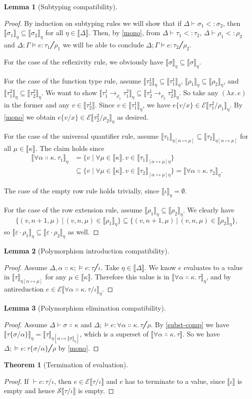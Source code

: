 \documentclass[a4paper, 12pt]{report}
\newcommand{\subst}[2]{\{#1/#2\}}
\newcommand{\E}{\mathcal{E}}
\renewcommand{\S}{\mathcal{S}}
\newcommand{\+}{\enspace}
\newtheorem{lemma}{Lemma}
\newtheorem{theorem}{Theorem}
\begin{document}
\begin{lemma}[Subtyping compatibility]
\end{lemma}
\begin{proof}
By induction on subtyping rules we will show that
if $Δ ⊢ σ_1 <: σ_2$, then $⟦σ_1⟧_η ⊆ ⟦σ_2⟧_η$ for all $η ∈ ⟦Δ⟧$.
Then, by \cref{mono}, from $Δ ⊢ τ_1 <: τ_2$, $Δ ⊢ ρ_1 <: ρ_2$ and $Δ; Γ ⊨ e : τ_1╱ρ_1$
we will be able to conclude
$Δ; Γ ⊨ e : τ_2╱ρ_2$.

For the case of the reflexivity rule,
we obviously have $⟦σ⟧_η ⊆ ⟦σ⟧_η$.

For the case of the function type rule,
assume $⟦τ_2^1⟧_η ⊆ ⟦τ_1^1⟧_η$, $⟦ρ_1⟧_η ⊆ ⟦ρ_2⟧_η$, and $⟦τ_1^2⟧_η ⊆ ⟦τ_2^2⟧_η$.
We want to show $⟦τ_1^1 →_{ρ_1} τ_1^2⟧_η ⊆ ⟦τ_2^1 →_{ρ_2} τ_2^2⟧_η$.
So take any $(λx.\,e)$ in the former and any $v ∈ ⟦τ_2^1⟧$.
Since $v ∈ ⟦τ_1^1⟧_η$, we have $e\subst{v}{x} ∈ \E⟦τ_1^2/ρ_1⟧_η$.
By \cref{mono} we obtain $e\subst{v}{x} ∈ \E⟦τ_2^2/ρ_2⟧_η$ as desired.

For the case of the universal quantifier rule,
assume $⟦τ_1⟧_{η[α↦μ]} ⊆ ⟦τ_2⟧_{η[α↦μ]}$ for all $μ ∈ ⟦κ⟧$.
The claim holds since
\begin{align*}
⟦∀α∷κ.\,τ_1⟧_η
&= \{ v \mid ∀μ∈⟦κ⟧.\, v ∈ ⟦τ_1⟧_{[α↦μ]η} \} \\
&⊆ \{ v \mid ∀μ∈⟦κ⟧.\, v ∈ ⟦τ_2⟧_{[α↦μ]η} \}
=
⟦∀α∷κ.\,τ_2⟧_η.
\end{align*}

The case of the empty row rule holds trivially, since $⟦ι⟧_η = ∅$.

For the case of the row extension rule, assume $⟦ρ_1⟧_η ⊆ ⟦ρ_2⟧_η$.
We clearly have
$$\{(v,n+1,μ) │ (v,n,μ) ∈ ⟦ρ_1⟧_η\} ⊆ \{(v,n+1,μ) │ (v,n,μ) ∈ ⟦ρ_2⟧_η\},$$
so $⟦ε·ρ_1⟧_η ⊆ ⟦ε·ρ_2⟧_η$ as well.

\end{proof}

\begin{lemma}[Polymorphism introduction compatibility]
\end{lemma}
\begin{proof}
Assume $Δ,α∷κ; ⊨ e : τ ╱ ι$.
Take $η∈⟦Δ⟧$.
We know $e$ evaluates to a value in $⟦τ⟧_{η[α↦μ]}$ for
any $μ∈⟦κ⟧$.
Therefore this value is in $⟦∀α∷κ.\,τ⟧_η$,
and by antireduction $e ∈ \E⟦∀α∷κ.\,τ/ι⟧_η$.
\end{proof}

\begin{lemma}[Polymorphism elimination compatibility]
\end{lemma}
\begin{proof}
Assume $Δ ⊢ σ ∷ κ$ and $Δ; ⊨ e : ∀α∷κ.\,τ╱ρ$.
By \cref{subst-comp} we have $⟦τ\subst{σ}{α}⟧_η = ⟦τ⟧_{η[α↦⟦σ⟧_η]}$,
which is a superset of $⟦∀α∷κ.\,τ⟧$.
So we have $Δ; ⊨ e : τ\subst{σ}{α} ╱ ρ$ by \cref{mono}.
\end{proof}

\begin{theorem}[Termination of evaluation]
\end{theorem}
\begin{proof}
If $⊢ e : τ / ι$, then
$e ∈ \E⟦τ/ι⟧$ and $e$ has to terminate to a value, since
$⟦ι⟧$ is empty and hence $\S⟦τ/ι⟧$ is empty.
\end{proof}



\end{document}

